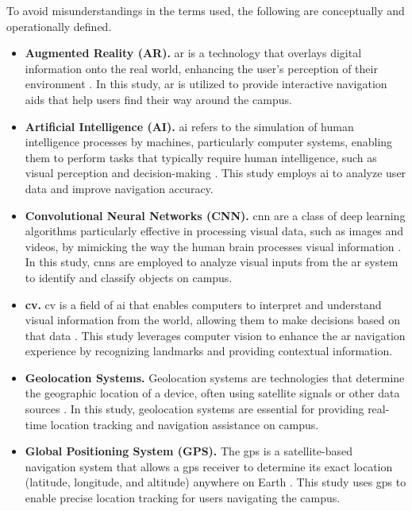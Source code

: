 \begin{refsection}
To avoid misunderstandings in the terms used, the following are conceptually and operationally defined.

\begin{itemize}

    \item \textbf{Augmented Reality (AR).} \gls{ar} is a technology that overlays digital information onto the real world, enhancing the user's perception of their environment \cite{9}. In this study, \gls{ar} is utilized to provide interactive navigation aids that help users find their way around the campus.
    
    \item \textbf{Artificial Intelligence (AI).} \gls{ai} refers to the simulation of human intelligence processes by machines, particularly computer systems, enabling them to perform tasks that typically require human intelligence, such as visual perception and decision-making \cite{10}. This study employs \gls{ai} to analyze user data and improve navigation accuracy.
    
    \item \textbf{Convolutional Neural Networks (CNN).} \gls{cnn} are a class of deep learning algorithms particularly effective in processing visual data, such as images and videos, by mimicking the way the human brain processes visual information \cite{11}. In this study, \gls{cnn}s are employed to analyze visual inputs from the \gls{ar} system to identify and classify objects on campus.
    
    \item \textbf{\gls{cv}. } \gls{cv} is a field of \gls{ai} that enables computers to interpret and understand visual information from the world, allowing them to make decisions based on that data \cite{12}. This study leverages computer vision to enhance the \gls{ar} navigation experience by recognizing landmarks and providing contextual information.
    
    \item \textbf{Geolocation Systems.} Geolocation systems are technologies that determine the geographic location of a device, often using satellite signals or other data sources \cite{13}. In this study, geolocation systems are essential for providing real-time location tracking and navigation assistance on campus.
    
    \item \textbf{Global Positioning System (GPS).} The \gls{gps} is a satellite-based navigation system that allows a \gls{gps} receiver to determine its exact location (latitude, longitude, and altitude) anywhere on Earth \cite{14}. This study uses \gls{gps} to enable precise location tracking for users navigating the campus.
    

\end{itemize}
\end{refsection}
